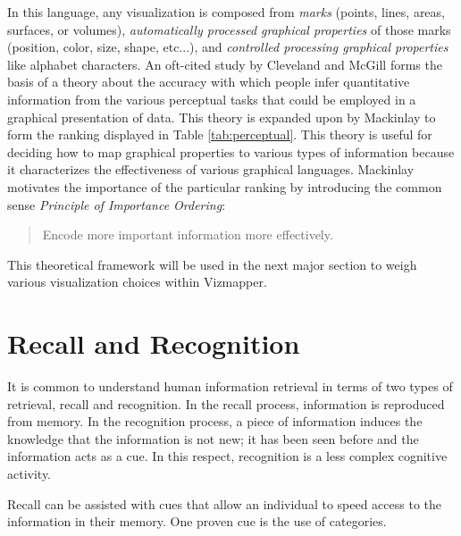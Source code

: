 In this language, any visualization is composed from \emph{marks} (points, lines, areas, surfaces, or volumes), \emph{automatically processed graphical properties} of those marks (position, color, size, shape, etc...), and \emph{controlled processing graphical properties} like alphabet characters. An oft-cited study by Cleveland and McGill \cite{cleveland1984} forms the basis of a theory about the accuracy with which people infer quantitative information from the various perceptual tasks that could be employed in a graphical presentation of data. This theory is expanded upon by Mackinlay \cite{jock1986} to form the ranking displayed in Table \ref{tab:perceptual}. This theory is useful for deciding how to map graphical properties to various types of information because it characterizes the effectiveness of various graphical languages. Mackinlay motivates the importance of the particular ranking by introducing the common sense \emph{Principle of Importance Ordering}:

\begin{quote}
Encode more important information more effectively. \cite{jock1986}
\end{quote}

\begin{comment}
The Structure of the Information Visualization Design Space, Section 2 
controlled vs. automatic processing
connection

Visual Information Seeking: Tight Coupling of Dynamic Query Filters with Starfield Displays
\end{comment}

This theoretical framework will be used in the next major section to weigh various visualization choices within Vizmapper.

\section{Recall and Recognition}

It is common to understand human information retrieval in terms of two types of retrieval, recall and recognition. In the recall process, information is reproduced from memory. In the recognition process, a piece of information induces the knowledge that the information is not new; it has been seen before and the information acts as a cue. In this respect, recognition is a less complex cognitive activity.

Recall can be assisted with cues that allow an individual to speed access to the information in their memory. One proven cue is the use of categories.

